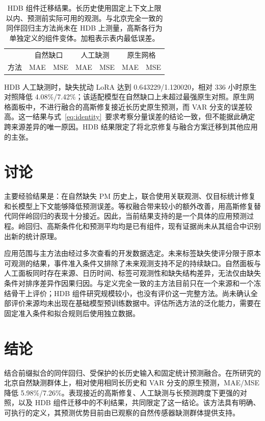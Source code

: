\begin{table}[t]
\caption{HDB 组件迁移结果。长历史使用固定上下文上限以内、预测前实际可用的观测。与北京完全一致的同伴回归主方法尚未在 HDB 上测量，高斯各行为单独定义的组件变体。加粗表示表内最低误差。}
\label{tab:hdb}
\centering\small
\setlength{\tabcolsep}{3.3pt}
\begin{tabular}{lrrrrrr}
\toprule
 & \multicolumn{2}{c}{自然缺口} & \multicolumn{2}{c}{人工缺测} & \multicolumn{2}{c}{原生网格}\\
方法 & MAE & MSE & MAE & MSE & MAE & MSE\\
\midrule

\end{tabular}
\end{table}

HDB 人工缺测时，缺失扰动 LoRA 达到 0.643229/1.120020，相对 336 小时原生对照降低 4.08\%/7.42\%；该适配模型在自然缺口上未超过最强原生对照。原生网格面板中，不进行融合的高斯修复接近长历史原生预测，而 VAR 分支的误差较高。这一结果与式~\eqref{eq:identity}~要求考察分量误差的结论一致，但不能据此确定跨来源差异的唯一原因。HDB 结果限定了将北京修复与融合方案迁移到其他应用的主张。

\section{讨论}
\label{sec:discussion}

主要经验结果是：在自然缺失 PM 历史上，联合使用关联观测、仅目标统计修复和长模型上下文能够降低预测误差。等权融合带来较小的额外改善，用高斯修复替代同伴岭回归的表现十分接近。因此，当前结果支持的是一个具体的应用预测过程。岭回归、高斯条件化和预测平均均是已有组件，现有证据尚未从其组合中识别出新的统计原理。

应用范围与主方法由经过多次查看的开发数据选定。未来标签缺失使评分限于原本可观测的结果，事件准入条件又排除了未来观测支持不足的持续缺口。自然面板与人工面板同时存在来源、日历时间、标签可观测性和缺失结构差异，无法仅由缺失条件对排序差异作因果归因。与定义完全一致的主方法目前只在一个来源和一个冻结骨干上评价；HDB 组件研究规模较小，也没有评价这一完整方法。尚未确认全部评价来源均未出现在基础模型预训练数据中。评估所选方法的泛化能力，需要在固定准入条件和拟合规则后使用独立数据。

\section{结论}
\label{sec:conclusion}

\method{}结合前缀拟合的同伴回归、受保护的长历史输入和固定统计预测融合。在所研究的北京自然缺测群体上，相对使用相同长历史和 VAR 分支的原生预测，MAE/MSE 降低 5.98\%/7.26\%。表现接近的高斯修复、人工缺测与长预测跨度下更强的对照，以及 HDB 组件迁移中的不利结果，共同限定了这一结论。该方法具有明确、可执行的定义，其预测优势目前由已观察的自然传感器缺测群体提供支持。

